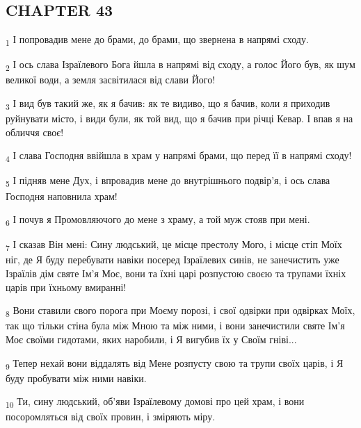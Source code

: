 \subsection{CHAPTER 43}
\begin{tcolorbox}
\textsubscript{1} І попровадив мене до брами, до брами, що звернена в напрямі сходу.
\end{tcolorbox}
\begin{tcolorbox}
\textsubscript{2} І ось слава Ізраїлевого Бога йшла в напрямі від сходу, а голос Його був, як шум великої води, а земля засвітилася від слави Його!
\end{tcolorbox}
\begin{tcolorbox}
\textsubscript{3} І вид був такий же, як я бачив: як те видиво, що я бачив, коли я приходив руйнувати місто, і види були, як той вид, що я бачив при річці Кевар. І впав я на обличчя своє!
\end{tcolorbox}
\begin{tcolorbox}
\textsubscript{4} І слава Господня ввійшла в храм у напрямі брами, що перед її в напрямі сходу!
\end{tcolorbox}
\begin{tcolorbox}
\textsubscript{5} І підняв мене Дух, і впровадив мене до внутрішнього подвір'я, і ось слава Господня наповнила храм!
\end{tcolorbox}
\begin{tcolorbox}
\textsubscript{6} І почув я Промовляючого до мене з храму, а той муж стояв при мені.
\end{tcolorbox}
\begin{tcolorbox}
\textsubscript{7} І сказав Він мені: Сину людський, це місце престолу Мого, і місце стіп Моїх ніг, де Я буду перебувати навіки посеред Ізраїлевих синів, не занечистить уже Ізраїлів дім святе Ім'я Моє, вони та їхні царі розпустою своєю та трупами їхніх царів при їхньому вмиранні!
\end{tcolorbox}
\begin{tcolorbox}
\textsubscript{8} Вони ставили свого порога при Моєму порозі, і свої одвірки при одвірках Моїх, так що тільки стіна була між Мною та між ними, і вони занечистили святе Ім'я Моє своїми гидотами, яких наробили, і Я вигубив їх у Своїм гніві...
\end{tcolorbox}
\begin{tcolorbox}
\textsubscript{9} Тепер нехай вони віддалять від Мене розпусту свою та трупи своїх царів, і Я буду пробувати між ними навіки.
\end{tcolorbox}
\begin{tcolorbox}
\textsubscript{10} Ти, сину людський, об'яви Ізраїлевому домові про цей храм, і вони посоромляться від своїх провин, і зміряють міру.
\end{tcolorbox}
